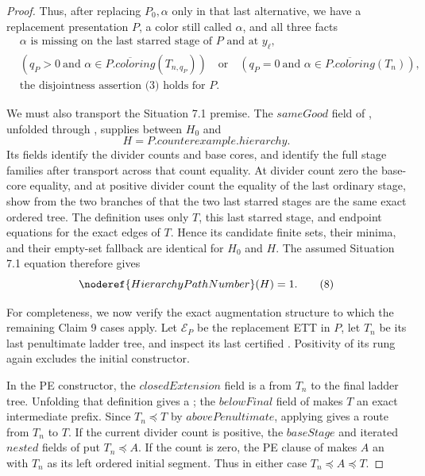 \begin{proof}
Thus, after replacing \(P_0,\alpha\) only in that last alternative, we
have a replacement presentation \(P\), a color still called \(\alpha\),
and all three facts
\[
\begin{split}
 &\alpha\text{ is missing on the last starred stage of }P
       \text{ and at }y_\ell,\\
 &(q_P>0\ \text{and }\alpha\in\overline{P.\mathit{coloring}}(T_{n,q_P}))
 \quad\text{or}\quad
 (q_P=0\ \text{and }\alpha\in\overline{P.\mathit{coloring}}(T_n)),\\
 &\text{the disjointness assertion (3) holds for }P.
\end{split}                                                    \tag{7}
\]

We must also transport the Situation 7.1 premise.  The
\(\mathit{sameGood}\) field of
, unfolded through
, supplies
 between \(H_0\) and
\[
                 H=P.\mathit{counterexample}.\mathit{hierarchy}.
\]
Its fields identify the divider counts and base cores, and identify the
full stage families after transport across that count equality.  At
divider count zero the base-core equality, and at positive divider count
the equality of the last ordinary stage, show from the two branches of
 that the two last starred stages are the
same exact ordered tree.  The definition
 uses only \(T\), this last starred stage,
and endpoint equations for the exact edges of \(T\).  Hence its candidate
finite sets, their minima, and their empty-set fallback are identical for
\(H_0\) and \(H\).  The assumed Situation 7.1 equation therefore gives
\[
                 \noderef{HierarchyPathNumber}(H)=1.          \tag{8}
\]

For completeness, we now verify the exact augmentation structure to
which the remaining Claim 9 cases apply.  Let \(\mathcal E_P\) be the
replacement ETT in \(P\), let \(T_n\) be its last penultimate ladder
tree, and inspect its last certified
.  Positivity of its rung again excludes
the initial constructor.

In the PE constructor, the \(\mathit{closedExtension}\) field is a
 from \(T_n\) to the final ladder tree.
Unfolding that definition gives a
; the
\(\mathit{belowFinal}\) field of
 makes \(T\) an exact intermediate
prefix.  Since \(T_n\preccurlyeq T\) by
\(\mathit{abovePenultimate}\), applying
 gives a route from
\(T_n\) to \(T\).  If the current divider count is positive, the
\(\mathit{baseStage}\) and iterated \(\mathit{nested}\) fields of
 put \(T_n\preccurlyeq A\).  If the count is
zero, the PE clause of  makes \(A\) an
 with \(T_n\) as its left ordered initial
segment.  Thus in either case \(T_n\preccurlyeq A\preccurlyeq T\).


\end{proof}
